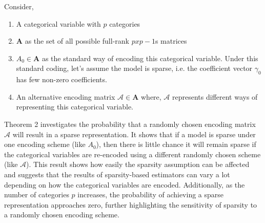 Consider, 
\begin{enumerate}
    \item A categorical variable with $p$ categories 
    \item $\mathbf{A}$ as the set of all possible full-rank $p x p-1$s matrices 
    \item $A_0 \in \mathbf{A}$ as the standard way of encoding this categorical variable. Under this standard coding, let's assume the model is sparse, i.e. the coefficient vector ${\gamma}_0$ has few non-zero coefficients.
    \item An alternative encoding matrix $\mathcal{A} \in \mathbf{A}$ where, $\mathcal{A}$ represents different ways of representing this categorical variable. 
\end{enumerate}
Theorem 2 investigates the probability that a randomly chosen encoding matrix $\mathcal{A}$ will result in a sparse representation. It shows that if a model is sparse under one encoding scheme (like $A_0$), then there is little chance it will remain sparse if the categorical variables are re-encoded using a different randomly chosen scheme (like $\mathcal{A}$). This result shows how easily the sparsity assumption can be affected and suggests that the results of sparsity-based estimators can vary a lot depending on how the categorical variables are encoded. Additionally, as the number of categories $p$ increases, the probability of achieving a sparse representation approaches zero, further highlighting the sensitivity of sparsity to a randomly chosen encoding scheme.

